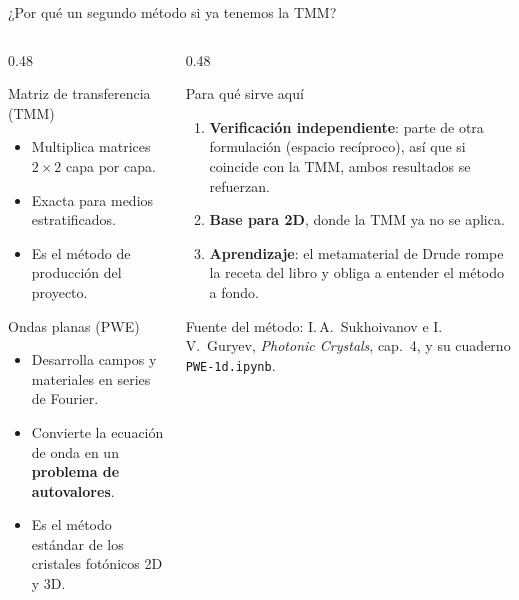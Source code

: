 \documentclass[aspectratio=169,10pt]{beamer}
\begin{document}
\begin{frame}{¿Por qué un segundo método si ya tenemos la TMM?}
  \begin{columns}[T]
    \begin{column}{0.48\textwidth}
      \begin{block}{Matriz de transferencia (TMM)}
        \small
        \begin{itemize}
          \item Multiplica matrices $2\times2$ capa por capa.
          \item Exacta para medios estratificados.
          \item Es el método de producción del proyecto.
        \end{itemize}
      \end{block}
      \begin{block}{Ondas planas (PWE)}
        \small
        \begin{itemize}
          \item Desarrolla campos y materiales en series de Fourier.
          \item Convierte la ecuación de onda en un \textbf{problema de autovalores}.
          \item Es el método estándar de los cristales fotónicos 2D y 3D.
        \end{itemize}
      \end{block}
    \end{column}
    \begin{column}{0.48\textwidth}
      \begin{exampleblock}{Para qué sirve aquí}
        \small
        \begin{enumerate}
          \item \textbf{Verificación independiente}: parte de otra formulación (espacio recíproco), así que
            si coincide con la TMM, ambos resultados se refuerzan.
          \item \textbf{Base para 2D}, donde la TMM ya no se aplica.
          \item \textbf{Aprendizaje}: el metamaterial de Drude rompe la receta del libro y obliga a
            entender el método a fondo.
        \end{enumerate}
      \end{exampleblock}
      \vspace{0.2em}
      \footnotesize Fuente del método: I.\,A.\ Sukhoivanov e I.\,V.\ Guryev, \textit{Photonic Crystals},
      cap.~4, y su cuaderno \texttt{PWE-1d.ipynb}.
    \end{column}
  \end{columns}
\end{frame}
\end{document}
